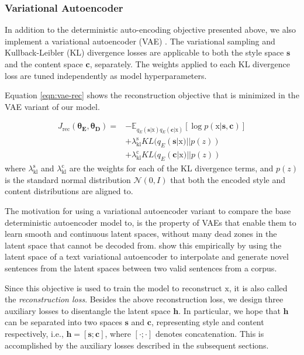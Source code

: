 \documentclass[letterpaper]{article} %
\newcommand{\rmx}{\mathrm x}
\newcommand{\loss}[2]{J_{\text{#1}}^{\text{#2}}}
\newcommand{\hyp}[2]{\lambda_{\text{#1}}^{\text{#2}}}
\newcommand{\nnweight}[2]{\bm{\theta_{\text{#1}}^{\text{#2}}}}
\newcommand{\citeay}[1]{\citeauthor{#1} \shortcite{#1}}
\begin{document}
\subsubsection{Variational Autoencoder}

In addition to the deterministic auto-encoding objective presented above, we also implement a variational autoencoder (VAE) \cite{kingma2013auto}.
The variational sampling and Kullback-Leibler (KL) divergence \cite{kullback1951information} losses are applicable to both the style space $\bm s$ and the content space $\bm c$, separately.
The weights applied to each KL divergence loss are tuned independently as model hyperparameters.

Equation \ref{eqn:vae-rec} shows the reconstruction objective that is minimized in the VAE variant of our model.

\begin{align} \label{eqn:vae-rec}
	\loss{rec}{}(\nnweight{E}{}, \nnweight{D}{}) = \nonumber
	 & - \mathbb{E}_{q_{E}(\bm s|\rmx) q_{E}(\bm c|\rmx)} [\log p(\rmx|\bm s, \bm c)] \nonumber \\
	 & + \hyp{kl}{s} KL(q_{E}(\bm s|\rmx)||p(z)) \nonumber                                      \\
	 & + \hyp{kl}{c} KL(q_{E}(\bm c|\rmx)||p(z))
\end{align}
where $\hyp{kl}{s}$ and $\hyp{kl}{c}$ are the weights for each of the KL divergence terms, and $p(z)$ is the standard normal distribution $\mathcal{N}(0,I)$ that both the encoded style and content distributions are aligned to.

The motivation for using a variational autoencoder variant to compare the base deterministic autoencoder model to, is the property of VAEs that enable them to learn smooth and continuous latent spaces, without many dead zones in the latent space that cannot be decoded from.
\citeay{bowman2016generating} show this empirically by using the latent space of a text variational autoencoder to interpolate and generate novel sentences from the latent spaces between two valid sentences from a corpus.

Since this objective is used to train the model to reconstruct $\rmx$, it is also called the \textit{reconstruction loss}.
Besides the above reconstruction loss, we design three auxiliary losses to disentangle the latent space $\bm h$.
In particular, we hope that $\bm h$ can be separated into two spaces $\bm s$ and $\bm c$, representing style and content respectively, i.e., $\bm h = [\bm s ; \bm c]$, where $[\cdot;\cdot]$ denotes concatenation.
This is accomplished by the auxiliary losses described in the subsequent sections.
\end{document}
